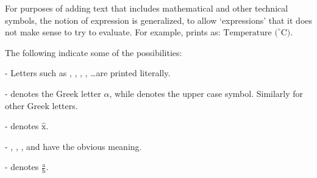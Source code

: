 For purposes of adding text that includes mathematical and other
technical symbols, the notion of expression is generalized, to allow
`expressions' that it does not make sense to try to evaluate. For
example,  prints as:
$\mbox{Temperature (}^{\circ}\mbox{C)}$.

The following indicate some of the possibilities:
\begin{itemizz}
  \item[-] Letters such as , , , ,
    \ldots are printed literally.
  \item[-]  denotes the Greek letter $\alpha$, while
     denotes the upper case symbol.  Similarly for
    other Greek letters.
  \item[-]  denotes $\hat{\mbox{x}}$.
  \item[-] , , ,
    and  have the obvious meaning.
  \item[-]  denotes $\frac{\mbox{a}}{\mbox{b}}$.
 \end{itemizz}

